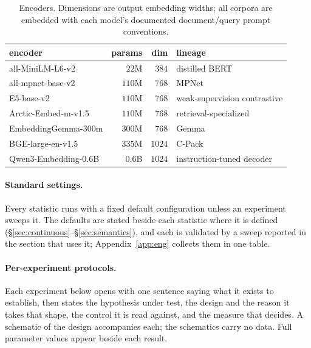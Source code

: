 \documentclass[11pt,letterpaper]{article}
\begin{document}
\begin{table}[t]
\centering
\caption{Encoders. Dimensions are output embedding widths; all corpora are
embedded with each model's documented document/query prompt conventions.}
\label{tab:encoders}
\small
\begin{tabular}{lrrl}
\toprule
encoder & params & dim & lineage\\
\midrule
all-MiniLM-L6-v2 \cite{reimers2019,wang2020minilm} & $22$M & $384$ & distilled BERT\\
all-mpnet-base-v2 \cite{reimers2019,song2020} & $110$M & $768$ & MPNet\\
E5-base-v2 \cite{wang2022e5} & $110$M & $768$ & weak-supervision contrastive\\
Arctic-Embed-m-v1.5 \cite{merrick2024} & $110$M & $768$ & retrieval-specialized\\
EmbeddingGemma-300m \cite{gemmateam2025} & $300$M & $768$ & Gemma\\
BGE-large-en-v1.5 \cite{xiao2023} & $335$M & $1024$ & C-Pack\\
Qwen3-Embedding-0.6B \cite{qwen3embedding} & $0.6$B & $1024$ & instruction-tuned decoder\\
\bottomrule
\end{tabular}
\end{table}

\paragraph{Standard settings.}
Every statistic runs with a fixed default configuration unless an
experiment sweeps it. The defaults are stated beside each statistic
where it is defined (\S\ref{sec:continuous}--\S\ref{sec:semantics}),
and each is validated by a sweep reported in the section that uses it;
Appendix~\ref{app:eng} collects them in one table.

\paragraph{Per-experiment protocols.}
Each experiment below opens with one sentence saying what it exists to
establish, then states the hypothesis under test, the design and the
reason it takes that shape, the control it is read against, and the
measure that decides. A schematic of the design accompanies each; the
schematics carry no data. Full parameter values appear beside each
result.
\end{document}
